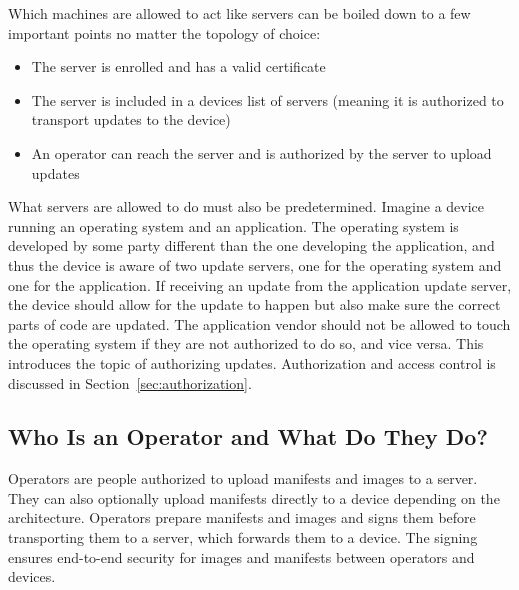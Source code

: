 \documentclass[0-thesis.tex]{subfiles}
\begin{document}
Which machines are allowed to act like servers can be boiled down to a few important
points no matter the topology of choice:

\begin{itemize}
    \item The server is enrolled and has a valid certificate
    \item The server is included in a devices list of servers (meaning it is authorized to
            transport updates to the device)
    \item An operator can reach the server and is authorized by the server to upload
            updates
\end{itemize}

What servers are allowed to do must also be predetermined. Imagine a device running an
operating system and an application. The operating system is developed by some party
different than the one developing the application, and thus the device is aware of two
update servers, one for the operating system and one for the application. If receiving an
update from the application update server, the device should allow for the update to
happen but also make sure the correct parts of code are updated. The application vendor
should not be allowed to touch the operating system if they are not authorized to do so,
and vice versa. This introduces the topic of authorizing updates. Authorization and access
control is discussed in Section~\ref{sec:authorization}.

\subsection{Who Is an Operator and What Do They Do?}
\label{ssec:who-is-an-operator}
Operators are people authorized to upload manifests and images to a server. They can also
optionally upload manifests directly to a device depending on the architecture. Operators
prepare manifests and images and signs them before transporting them to a server, which
forwards them to a device. The signing ensures end-to-end security for images and
manifests between operators and devices.
\end{document}
